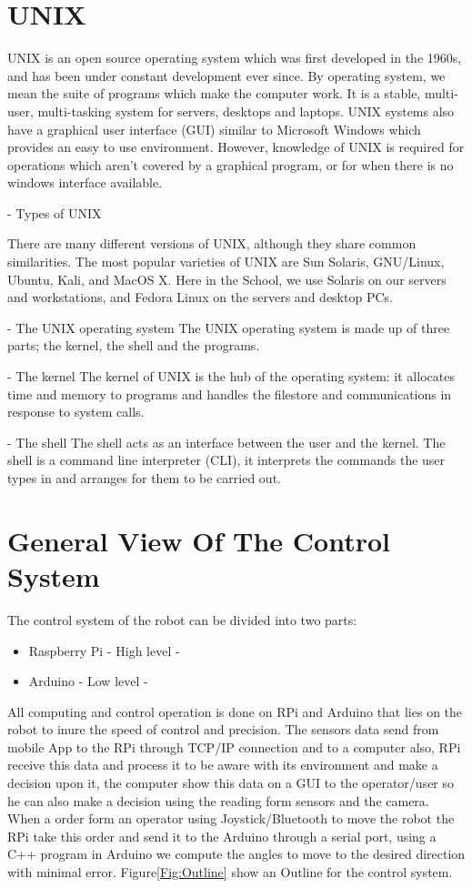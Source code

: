 \section{UNIX}
	UNIX is an open source operating system which was first developed in the 1960s, and has been under constant development ever since. By operating system, we mean the suite of programs which make the computer work. It is a stable, multi-user, multi-tasking system for servers, desktops and laptops.
	UNIX systems also have a graphical user interface (GUI) similar to Microsoft Windows which provides an easy to use environment. However, knowledge of UNIX is required for operations which aren't covered by a graphical program, or for when there is no windows interface available.
	
	- Types of UNIX
	
	There are many different versions of UNIX, although they share common similarities. The most popular varieties of UNIX are Sun Solaris, GNU/Linux, Ubuntu, Kali, and MacOS X.
	Here in the School, we use Solaris on our servers and workstations, and Fedora Linux on the servers and desktop PCs.
	
	- The UNIX operating system
	The UNIX operating system is made up of three parts; the kernel, the shell and the programs.
	
	- The kernel
	The kernel of UNIX is the hub of the operating system: it allocates time and memory to programs and handles the filestore and communications in response to system calls.
	
	- The shell
	The shell acts as an interface between the user and the kernel. The shell is a command line interpreter (CLI), it interprets the commands the user types in and arranges for them to be carried out.
	

\section{General View Of The Control System}

The control system of the robot can be divided into two parts:

\begin{itemize}
\item Raspberry Pi - High level -
\item Arduino - Low level -
\end{itemize}

All computing and control operation is done on RPi and Arduino that lies on the robot to inure the speed of control and precision.
The sensors data send from mobile App to the RPi through TCP/IP connection and to a computer also, RPi receive this data and process it to be aware with its environment and make a decision upon it, the computer show this data on a GUI to the operator/user so he can also make a decision using the reading form sensors and the camera.
When a order form an operator using Joystick/Bluetooth to move the robot the RPi take this order and send it to the Arduino through a serial port, using a C++ program in Arduino we compute the angles to move to the desired direction with minimal error. Figure\ref{Fig:Outline} show an Outline for the control system.

